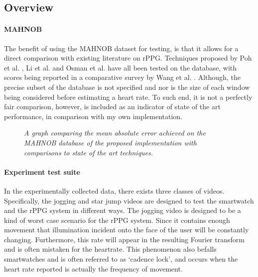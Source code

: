 \subsection{Overview}



\paragraph{MAHNOB}
The benefit of using the MAHNOB dataset for testing, is that it allows for a direct comparison with existing literature on rPPG.
Techniques proposed by Poh et al. \cite{poh}, Li et al. \cite{li} and Osman et al. \cite{osman} have all been tested on the database, with 
scores being reported in a comparative survey by Wang et al. \cite{comparative}.
Although, the precise subset of the database is not specified and nor is the size of each window being considered before estimating a heart rate.
To such end, it is not a perfectly fair comparison, however, is included as an indicator of state of the art performance, in comparison with my own implementation.

\begin{figure}
    \centering
    \scalebox{0.6}{}
   \caption{\textit{A graph comparing the mean absolute error achieved on the MAHNOB database of the proposed implementation with comparisons to state of the art techniques.}}
\end{figure}
\paragraph{Experiment test suite}
In the experimentally collected data, there exists three classes of videos. Specifically, the jogging and star jump videos are designed to test the smartwatch and 
the rPPG system in different ways. The jogging video is designed to be a kind of worst case scenario for the rPPG system. Since it contains enough movement that
illumination incident onto the face of the user will be constantly changing. Furthermore, this rate will appear in the resulting Fourier transform and is often mistaken
for the heartrate. This phenomenon also befalls smartwatches and is often referred to as `cadence lock', and occurs when the heart rate reported is actually the frequency 
of movement.

